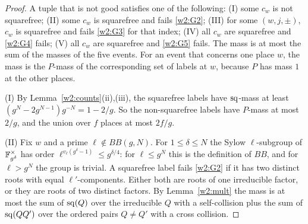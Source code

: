 \begin{proof}
A tuple that is not good satisfies one of the following: (I) some $c_w$ is not squarefree; (II) some $c_w$ is squarefree and fails \ref{w2:G2}; (III) for some $(w,j,\pm)$, $c_w$ is squarefree and fails \ref{w2:G3} for that index; (IV) all $c_w$ are squarefree and \ref{w2:G4} fails; (V) all $c_w$ are squarefree and \ref{w2:G5} fails. The mass is at most the sum of the masses of the five events. For an event that concerns one place $w$, the mass is the $P$-mass of the corresponding set of labels at $w$, because $P$ has mass $1$ at the other places.

(I) By Lemma~\ref{w2:counts}(ii),(iii), the squarefree labels have $\mathrm{sq}$-mass at least $(g^N-2g^{N-1})g^{-N}=1-2/g$. So the non-squarefree labels have $P$-mass at most $2/g$, and the union over $f$ places at most $2f/g$.

(II) Fix $w$ and a prime $\ell\notin BB(g,N)$. For $1\le\delta\le N$ the Sylow $\ell$-subgroup of $\mathbb F_{g^\delta}^\times$ has order $\ell^{v_\ell(g^\delta-1)}\le g^{\delta/4}$: for $\ell\le g^N$ this is the definition of $BB$, and for $\ell>g^N$ the group is trivial. A squarefree label fails \ref{w2:G2} if it has two distinct roots with equal $\ell'$-components. Either both are roots of one irreducible factor, or they are roots of two distinct factors. By Lemma~\ref{w2:mult} the mass is at most the sum of $\mathrm{sq}(Q)$ over the irreducible $Q$ with a self-collision plus the sum of $\mathrm{sq}(QQ')$ over the ordered pairs $Q\ne Q'$ with a cross collision.


\end{proof}
